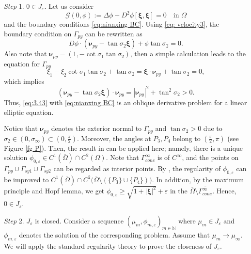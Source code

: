 \documentclass[reqno,12pt]{amsart}
\numberwithin{equation}{section}
\begin{document}
\textit{Step} 1. $0\in J_{\varepsilon}$. Let us consider
\begin{equation}\label{eq:3.43}
	\mathcal{G}(0,\phi):=\Delta\phi+D^{2}\phi[\bm{\xi},\bm{\xi}]=0\quad\text{in $\Omega$}
\end{equation}
and the boundary conditions \eqref{eq:nianxing BC}. Using \eqref{eq: velocity3}, the boundary condition on $\Gamma_{py}$ can be rewritten as
	\begin{equation}\label{eq:condition on py}
		D\phi\cdot(\bm{\nu}_{py}-\tan\sigma_2\bm{\xi})+\phi\tan\sigma_2=0.
	\end{equation}
Also note that $\bm{\nu}_{py}=(1,-\cot\sigma_1\tan\sigma_2)$, then a simple calculation leads to the equation for $\Gamma_{py}$
        \begin{equation}\label{eq:equation of py}
		\xi_1-\xi_2\cot\sigma_1\tan\sigma_2+\tan\sigma_2=\bm{\xi}\cdot\bm{\nu}_{py}+\tan\sigma_2=0,
	\end{equation}
which implies
        \begin{equation}\label{eq:contrast}
		(\bm{\nu}_{py}-\tan\sigma_2\bm{\xi})\cdot \bm{\nu}_{py}=|\bm{\nu}_{py}|^2+\tan^2\sigma_2>0.
	\end{equation}
Thus, \eqref{eq:3.43} with \eqref{eq:nianxing BC} is an oblique derivative problem for a linear elliptic equation. 

Notice that $\bm{\nu}_{py}$ denotes the exterior normal to $\Gamma_{py}$ and $\tan\sigma_2>0$ due to $\sigma_2\in(0,\sigma_\infty)\subset(0,\frac{\pi}{2})$. Moreover, the angles at $P_3,P_4$ belong to $(\frac{\pi}{2},\pi)$ (see Figure \ref{fg P}). Then, the result in \cite[Theorem 1]{Lieb88} can be applied here; namely, there is a unique solution $\phi_{0,\varepsilon}\in C^{1}(\overline{\Omega})\cap C^{2}(\Omega)$. Note that  $\Gamma_{cone}^{\infty}$ is of $C^\infty$, and the points on $\Gamma_{py}\cup\Gamma_{sy1}\cup\Gamma_{sy2}$ can be regarded as interior points. By \cite[Lemma 6.18]{GT01}, the regularity of $\phi_{0,\varepsilon}$ can be improved to $C^{1}(\overline{\Omega})\cap C^{2}\big(\overline{\Omega}\setminus(\{P_3\}\cup\{P_4\})\big)$. In addition, by the maximum principle and Hopf lemma, we get $\phi_{0,\varepsilon}\geq \sqrt{1+|\bm{\xi}|^2}+\varepsilon$ in the $\overline{\Omega}\setminus\overline{\Gamma_{cone}^{\infty}}$. Hence, $0\in J_{\varepsilon}$.

\textit{Step} 2. $J_{\varepsilon}$ is closed. Consider a sequence $(\mu_{m},\phi_{m,\varepsilon})_{m\in\mathbb{N}}$ where $\mu_{m} \in J_{\varepsilon}$ and $\phi_{m,\varepsilon}$ denotes the solution of the corresponding problem. Assume that $\mu_{m} \to \mu_{\infty}$. We will apply the standard regularity theory to prove the closeness of $J_{\varepsilon}$. 
\end{document}

